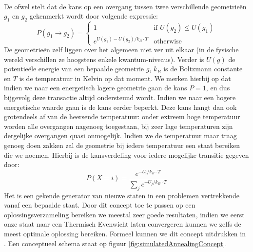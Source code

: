 \paragraph{}De  ofwel  stelt dat de kans op een overgang tussen twee verschillende geometrie\"en $g_1$ en $g_2$ gekenmerkt wordt door volgende expressie:
\begin{equation}
P\left(g_1\rightarrow g_2\right)=\left\{\begin{array}{ll}
1&\mbox{if } U\left(g_2\right)\leq U\left(g_1\right)\\
e^{U\left(g_1\right)-U\left(g_2\right)/k_B\cdot T}&\mbox{otherwise}
\end{array}\right.
\end{equation}
De geometrie\"en zelf liggen over het algemeen niet ver uit elkaar (in de fysische wereld verschillen ze hoogstens enkele kwantum-niveaus). Verder is $U\left(g\right)$ de potentie\"ele energie van een bepaalde geometrie $g$, $k_B$ is de Boltzmann constante en $T$ is de temperatuur in Kelvin op dat moment. We merken hierbij op dat indien we naar een energetisch lagere geometrie gaan de kans $P=1$, en dus bijgevolg deze transactie altijd ondersteund wordt. Indien we naar een hogere energetische waarde gaan is de kans eerder beperkt. Deze kans hangt dan ook grotendeels af van de heersende temperatuur: onder extreem hoge temperatuur worden alle overgangen nagenoeg toegestaan, bij zeer lage temperaturen zijn dergelijke overgangen quasi onmogelijk. Indien we de temperatuur maar traag genoeg doen zakken zal de geometrie bij iedere temperatuur een staat bereiken die we  noemen. Hierbij is de kansverdeling voor iedere mogelijke transitie gegeven door:
\begin{equation}
P\left(X=i\right)=\displaystyle\frac{e^{-U_i/k_B\cdot T}}{\sum_j e^{-U_j/k_B\cdot T}}
\end{equation}
Het  is een gekende generator van nieuwe staten in een problemen vertrekkende vanaf een bepaalde staat. Door dit concept toe te passen op een oplossingsverzameling bereiken we meestal zeer goede resultaten, indien we eerst onze staat naar een Thermisch Evenwicht laten convergeren kunnen we zelfs de meest optimale oplossing bereiken. Formeel kunnen we dit concept uitdrukken in . Een conceptueel schema staat op figuur \ref{fig:simulatedAnnealingConcept}.
